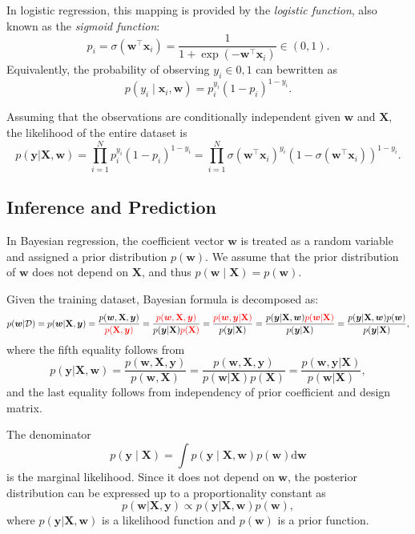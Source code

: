 \documentclass[../Bayesian_Inference.tex]{subfiles}
\begin{document}
In logistic regression, this mapping is provided by the \emph{logistic function}, also known as the \emph{sigmoid function}: 
\[
    p_i = \sigma(\bm{w}^{\top}\bm{x}_i) = \frac{1}{1+\exp(-\bm{w}^{\top}\bm{x}_i)} \in (0,1).
\]
Equivalently, the probability of observing $y_i \in {0,1}$ can be{w}ritten as 
\[
    p(y_i \mid \bm{x}_i,\bm{w}) = p_i^{y_i}(1-p_i)^{1-y_i}.
\]

Assuming that the observations are conditionally independent given $\bm{w}$ and $\mathbf{X}$, the likelihood of the entire dataset is
\[
    p(\bm{y}| \mathbf{X}, \bm{w}) = \prod_{i=1}^{N} p_i^{y_i} (1 - p_i)^{1-y_i} = \prod_{i=1}^{N} \sigma(\bm{w}^{\top}\bm{x}_i)^{y_i} (1 - \sigma(\bm{w}^{\top}\bm{x}_i))^{1-y_i}.
\]


\subsection{Inference and Prediction}

In Bayesian regression, the coefficient vector $\bm{w}$ is treated as a random variable and assigned a prior distribution $p(\bm{w})$. We assume that the prior distribution of $\bm{w}$ does not depend on $\mathbf{X}$, and thus $p(\bm{w}\mid\mathbf{X})=p(\bm{w})$.


Given the training dataset, Bayesian formula is decomposed as: 
\[
    p(\bm{w} | \mathcal{D}) = p(\bm{w} | \mathbf{X}, \bm{y}) = \frac{p(\bm{w}, \mathbf{X}, \bm{y})}{\textcolor{red}{p(\mathbf{X}, \bm{y})}} = \frac{\textcolor{red}{p(\bm{w}, \mathbf{X}, \bm{y})}}{p(\bm{y}|\mathbf{X}) \textcolor{red}{p(\mathbf{X})} } = \frac{\textcolor{red}{p(\bm{w}, \bm{y} | \mathbf{X})}}{p(\bm{y}|\mathbf{X})} = \frac{p(\bm{y} | \mathbf{X}, \bm{w}) \textcolor{red}{p(\bm{w} | \mathbf{X})}}{p(\bm{y}|\mathbf{X})} = \frac{p(\bm{y} | \mathbf{X}, \bm{w}) p(\bm{w})}{p(\bm{y}|\mathbf{X})},
\]
where the fifth equality follows from
\[
    p(\bm{y} | \mathbf{X}, \bm{w}) = \frac{p(\bm{w}, \mathbf{X}, \bm{y})}{p(\bm{w}, \mathbf{X})} = \frac{p(\bm{w}, \mathbf{X}, \bm{y})}{ p(\bm{w} | \mathbf{X}) p(\mathbf{X})} = \frac{p(\bm{w}, \bm{y} | \mathbf{X})}{p(\bm{w} | \mathbf{X})},
\]
and the last equality follows from independency of prior coefficient and design matrix. 

The denominator 
\[
    p(\bm{y}\mid\mathbf{X}) = \int p(\bm{y}\mid\mathbf{X},\bm{w}) p(\bm{w})\mathrm{d}\bm{w}
\]  
is the marginal likelihood. Since it does not depend on $\bm{w}$, the posterior distribution can be expressed up to a proportionality constant as 
\[
    p(\bm{w} | \mathbf{X}, \bm{y}) \propto p(\bm{y} | \mathbf{X}, \bm{w}) p(\bm{w}),
\]
where $p(\bm{y} | \mathbf{X}, \bm{w})$ is a likelihood function and $p(\bm{w})$ is a prior function.
\end{document}
